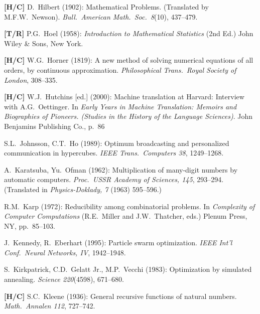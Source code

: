 \begin{thebibliography}{999}
{\bf [H/C]}
D.~Hilbert (1902): Mathematical Problems.  (Translated by M.F.W.~Newson).  {\it Bull.~American Math.~Soc.~8}(10), 437--479.

{\bf [T/R]}
P.G.~Hoel (1958): {\it Introduction to Mathematical Statistics} (2nd Ed.)  John Wiley \& Sons, New York.

{\bf [H/C]}
W.G.~Horner (1819):  A new method of solving numerical equations of all orders, by
continuous approximation. {\it Philosophical Trans.~Royal Society of London}, 308--335.

{\bf [H/C]}
W.J.~Hutchins [ed.] (2000): Machine translation at Harvard: Interview with A.G.~Oettinger.
In {\it Early Years in Machine Translation: Memoirs and Biographies of Pioneers.  (Studies in the History of the Language Sciences)}.  John Benjamins Publishing Co., p.~86







S.L.~Johnsson, C.T.~Ho (1989):  Optimum broadcasting and personalized communication in hypercubes.  {\it IEEE Trans.~Computers 38}, 1249--1268.



A.~Karatsuba, Yu.~Ofman (1962):
Multiplication of many-digit numbers by automatic computers.  {\it Proc.~USSR Academy of Sciences, 145}, 293--294.  (Translated in {\it Physics-Doklady, 7} (1963) 595--596.)

R.M.~Karp (1972): Reducibility among combinatorial problems.  In 
{\it Complexity of Computer Computations} (R.E.~Miller and J.W.~Thatcher, eds.)  Plenum Press, NY, pp.~85--103.

J.~Kennedy, R.~Eberhart (1995): Particle swarm optimization.  {\it IEEE Int'l Conf.~Neural
Networks, IV}, 1942--1948.

S.~Kirkpatrick, C.D.~Gelatt Jr., M.P.~Vecchi (1983):
Optimization by simulated annealing.  {\it Science 220}(4598), 671--680.

{\bf [H/C]}
S.C.~Kleene (1936): General recursive functions of natural numbers.  {\it Math.~Annalen 112}, 727--742.


\end{thebibliography}
